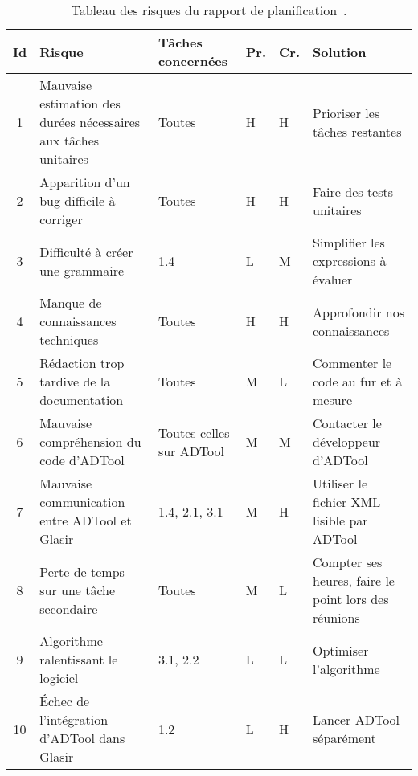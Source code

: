     \begin{table}[H]
        \centering
        \begin{tabular}{|c|p{4cm}|l|l|l|p{4cm}|}
        	\hline
            \textbf{Id} & \textbf{Risque} & \textbf{Tâches concernées} & \textbf{Pr.} & \textbf{Cr.} & \textbf{Solution}\\
            \hline
            1 & Mauvaise estimation des durées nécessaires aux tâches unitaires & 
                Toutes & H & H &
                Prioriser les tâches restantes\\ 
            \hline
            2 & Apparition d'un bug difficile à corriger & 
                Toutes & H & H &
                Faire des tests unitaires\\
            \hline
            3 & Difficulté à créer une grammaire & 
                1.4 & L & M &
                Simplifier les expressions à évaluer\\ 
            \hline
            4 & Manque de connaissances techniques & 
                Toutes & H & H &
                Approfondir nos connaissances\\ 
            \hline
            5 & Rédaction trop tardive de la documentation & 
                Toutes & M & L &
                Commenter le code au fur et à mesure\\
            \hline
            6 & Mauvaise compréhension du code d'ADTool & 
                Toutes celles sur ADTool & M & M &
                Contacter le développeur d'ADTool\\ 
            \hline
            7 & Mauvaise communication entre ADTool et Glasir & 
                1.4, 2.1, 3.1 & M & H &
                Utiliser le fichier XML lisible par ADTool\\ 
            \hline
            8 & Perte de temps sur une tâche secondaire & 
                Toutes & M & L &
                Compter ses heures, faire le point lors des réunions\\ 
            \hline
            9 & Algorithme ralentissant le logiciel & 
                3.1, 2.2 & L & L &
                Optimiser l’algorithme\\ 
            \hline
            10 & Échec de l'intégration d'ADTool dans Glasir & 
                1.2 & L & H &
                Lancer ADTool séparément\\ 
            \hline
        \end{tabular}
        \caption{Tableau des risques du rapport de planification~\cite{planif}.}
        \label{fig:risques}
    \end{table}

